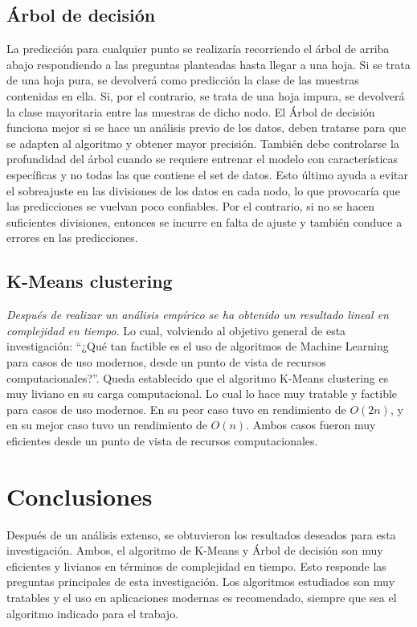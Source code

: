 \documentclass{article}
\begin{document}
\subsection{Árbol de decisión}
La predicción para cualquier punto se realizaría recorriendo el árbol de arriba abajo respondiendo a las preguntas planteadas hasta llegar a una hoja. Si se trata de una hoja pura, se devolverá como predicción la clase de las muestras contenidas en ella. Si, por el contrario, se trata de una hoja impura, se devolverá la clase mayoritaria entre las muestras de dicho nodo.
El Árbol de decisión funciona mejor si se hace un análisis previo de los datos, deben tratarse para que se adapten al algoritmo y obtener mayor precisión. También debe controlarse la profundidad del árbol cuando se requiere entrenar el modelo con características específicas y no todas las que contiene el set de datos.
Esto último ayuda a evitar el sobreajuste en las divisiones de los datos en cada nodo, lo que provocaría que las predicciones se vuelvan poco confiables.
Por el contrario, si no se hacen suficientes divisiones, entonces se incurre en falta de ajuste y también conduce a errores en las predicciones.
\subsection{K-Means clustering}
\textit{Después de realizar un análisis empírico se ha obtenido un resultado lineal en complejidad en tiempo.}
Lo cual, volviendo al objetivo general de esta investigación: ``¿Qué tan factible es el uso de algoritmos de Machine Learning para casos de uso modernos, desde un punto de vista de recursos computacionales?''. Queda establecido que el algoritmo K-Means clustering es muy liviano en su carga computacional. Lo cual lo hace muy tratable y factible para casos de uso modernos. En su peor caso tuvo en rendimiento de \(O(2n)\), y en su mejor caso tuvo un rendimiento de \(O(n)\). Ambos casos fueron muy eficientes desde un punto de vista de recursos computacionales.

\section{Conclusiones}
Después de un análisis extenso, se obtuvieron los resultados deseados para esta investigación. Ambos, el algoritmo de K-Means y Árbol de decisión son muy eficientes y livianos en términos de complejidad en tiempo. Esto responde las preguntas principales de esta investigación. Los algoritmos estudiados son muy tratables y el uso en aplicaciones modernas es recomendado, siempre que sea el algoritmo indicado para el trabajo.
\end{document}
